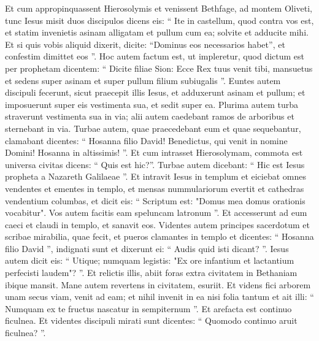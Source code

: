 \begin{biblechapter}
\begin{biblechapter}
\begin{biblechapter}
\begin{biblechapter}
\begin{biblechapter}
\begin{biblechapter}
\begin{biblechapter}
\begin{biblechapter}
\begin{biblechapter}
\begin{biblechapter}
\begin{biblechapter}
\begin{biblechapter}
\begin{biblechapter}
\begin{biblechapter}
\begin{biblechapter}
\begin{biblechapter}
\begin{biblechapter}
\begin{biblechapter}
\begin{biblechapter}
\begin{biblechapter}
\begin{biblechapter}
\verse Et cum appropinquassent Hierosolymis et venissent Bethfage, ad montem Oliveti, tunc Iesus misit duos discipulos 
\verse dicens eis: “ Ite in castellum, quod contra vos est, et statim invenietis asinam alligatam et pullum cum ea; solvite et adducite mihi. 
\verse Et si quis vobis aliquid dixerit, dicite: “Dominus eos necessarios habet”, et confestim dimittet eos ”. 
\verse Hoc autem factum est, ut impleretur, quod dictum est per prophetam dicentem:
 \verse “ Dicite filiae Sion:
 Ecce Rex tuus venit tibi,
 mansuetus et sedens super asinam
 et super pullum filium subiugalis ”.
 \verse Euntes autem discipuli fecerunt, sicut praecepit illis Iesus, 
\verse et adduxerunt asinam et pullum; et imposuerunt super eis vestimenta sua, et sedit super ea. 
\verse Plurima autem turba straverunt vestimenta sua in via; alii autem caedebant ramos de arboribus et sternebant in via. 
\verse Turbae autem, quae praecedebant eum et quae sequebantur, clamabant dicentes: “ Hosanna filio David! Benedictus, qui venit in nomine Domini! Hosanna in altissimis! ”.
 \verse Et cum intrasset Hierosolymam, commota est universa civitas dicens: “ Quis est hic?”. 
\verse Turbae autem dicebant: “ Hic est Iesus propheta a Nazareth Galilaeae ”.
 \verse Et intravit Iesus in templum et eiciebat omnes vendentes et ementes in templo, et mensas nummulariorum evertit et cathedras vendentium columbas, 
\verse et dicit eis: “ Scriptum est: "Domus mea domus orationis vocabitur". Vos autem facitis eam speluncam latronum ”.
 \verse Et accesserunt ad eum caeci et claudi in templo, et sanavit eos. 
\verse Videntes autem principes sacerdotum et scribae mirabilia, quae fecit, et pueros clamantes in templo et dicentes: “ Hosanna filio David ”, indignati sunt 
\verse et dixerunt ei: “ Audis quid isti dicant? ”. Iesus autem dicit eis: “ Utique; numquam legistis: "Ex ore infantium et lactantium perfecisti laudem"? ”. 
\verse Et relictis illis, abiit foras extra civitatem in Bethaniam ibique mansit.
 \verse Mane autem revertens in civitatem, esuriit. 
\verse Et videns fici arborem unam secus viam, venit ad eam; et nihil invenit in ea nisi folia tantum et ait illi: “ Numquam ex te fructus nascatur in sempiternum ”. Et arefacta est continuo ficulnea. 
\verse Et videntes discipuli mirati sunt dicentes: “ Quomodo continuo aruit ficulnea? ”. 

\end{biblechapter}
\end{biblechapter}
\end{biblechapter}
\end{biblechapter}
\end{biblechapter}
\end{biblechapter}
\end{biblechapter}
\end{biblechapter}
\end{biblechapter}
\end{biblechapter}
\end{biblechapter}
\end{biblechapter}
\end{biblechapter}
\end{biblechapter}
\end{biblechapter}
\end{biblechapter}
\end{biblechapter}
\end{biblechapter}
\end{biblechapter}
\end{biblechapter}
\end{biblechapter}
